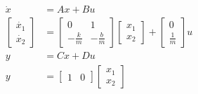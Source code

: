 \documentclass[../main.tex]{subfiles}
\begin{document}
                \begin{equation}
                    \begin{split}
                        \dot{x} &= Ax + Bu \\[5pt]
                        \begin{bmatrix} \dot{x_1} \\ \dot{x_2} \end{bmatrix} &= \begin{bmatrix} 0 & 1 \\ -\frac{k}{m} & -\frac{b}{m} \end{bmatrix} \begin{bmatrix} x_1 \\ x_2 \end{bmatrix} + \begin{bmatrix} 0 \\ \frac{1}{m} \end{bmatrix} u\\[10pt]
                        y &= Cx+Du \\[5pt]
                        y &= \begin{bmatrix} 1 & 0 \end{bmatrix} \begin{bmatrix} x_1 \\ x_2 \end{bmatrix}
                        \label{persamaan_4}
                    \end{split}
                \end{equation}
\end{document}
